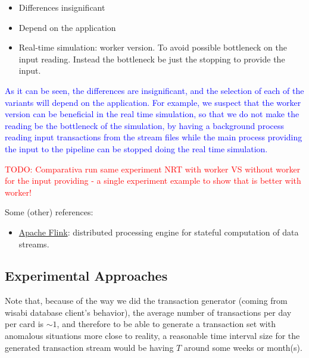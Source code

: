 \begin{itemize}
  \item Differences insignificant
  \item Depend on the application
  \item Real-time simulation: worker version. To avoid possible bottleneck on the input reading. Instead the bottleneck be just the stopping to provide the input.
\end{itemize}

\textcolor{blue}{As it can be seen, the differences are insignificant, and the selection of each of the variants will depend on the application. For example, we suspect that the worker version can be beneficial in the real time simulation, so that we do not make the reading be the bottleneck of the simulation, by having a background process reading input transactions from the stream files while the main process providing the input to the pipeline can be stopped doing the real time simulation.}

\textcolor{red}{TODO: Comparativa run same experiment NRT with worker VS without worker for the input providing - a single experiment example to show that is better with worker!}

Some (other) references:

\begin{itemize}
  \item \href{https://www.confluent.io/es-es/learn/apache-flink/}{Apache Flink}: distributed processing engine for stateful computation of data streams.
\end{itemize}

\subsection{Experimental Approaches}

Note that, because of the way we did the transaction generator (coming from wisabi database client's behavior), the average number of transactions per day per card is $\sim1$, and therefore to be able to generate a transaction set with anomalous situations more close to reality, a reasonable time interval size for the generated transaction stream would be having $T$ around some weeks or month(s).

